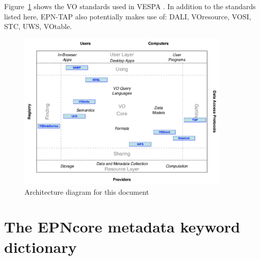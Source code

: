 \documentclass[11pt,a4paper]{ivoa}
\begin{document}
Figure~\ref{fig:archdiag} shows the VO standards used in VESPA \citep{note:VOARCH}.
In addition to the standards listed here, EPN-TAP also potentially makes use of: DALI, VOresource, VOSI, STC, UWS, VOtable. 



\begin{figure}[thb]
\centering

\includegraphics[width=0.9\textwidth]{role_diagram.pdf}
\caption{Architecture diagram for this document}
\label{fig:archdiag}
\end{figure}

\clearpage %

\section{The EPNcore metadata keyword dictionary} 
\end{document}
